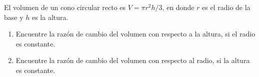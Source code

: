 \setcounter{enumi}{67}
\item El volumen de un cono circular recto es $V = \pi r^2h/3$, en donde $r$ es el radio de la base y $h$ es la altura.
\begin{enumerate}
    \item[(a)] Encuentre la razón de cambio del volumen con respecto a la altura, si el radio es constante.
    \item[(b)] Encuentre la razón de cambio del volumen con respecto al radio, si la altura es constante.
\end{enumerate}
